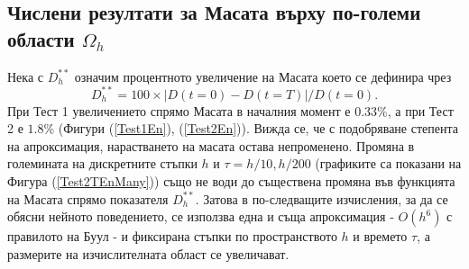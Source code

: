 \documentclass{article}
\newcommand{\be}{\begin{equation}}
\newcommand{\ee}{\end{equation}}
\newcommand{\rf}[1]{(\ref{#1})}
\begin{document}
\subsection{Числени резултати за Масата върху по-големи области $\Omega_h$}
Нека с $D_h^{**}$ означим процентното увеличение на Масата което се дефинира чрез
\be
D_h^{**} = 100 \times |D(t=0) - D(t=T)|/D(t=0).
\ee
При Тест 1 увеличението спрямо Масата в началния момент е $0.33\%$, а при Тест 2 е $1.8\%$ (Фигури \rf{Test1En}, \rf{Test2En}). Вижда се, че с подобряване степента на апроксимация, нарастването на масата остава непроменено. Промяна в големината на дискретните стъпки $h$ и $\tau=h/10, h/200$ (графиките са показани на Фигура \rf{Test2TEnMany}) също не води до съществена промяна във функцията на Масата спрямо показателя $D_h^{**}$. Затова в по-следващите изчисления, за да се обясни нейното поведението, се използва една и съща апроксимация - $O(h^6)$ с правилото на Буул - и фиксирана стъпки по пространството $h$ и времето $\tau$, а размерите на изчислителната област се увеличават.
\end{document}
